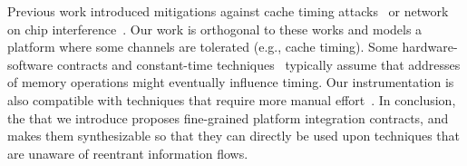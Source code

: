 Previous work introduced mitigations against cache timing attacks~\cite{kar2023mitigating,saileshwar2021mirage,giner2023scatter,werner2019scattercache,qureshi2018ceaser} or network on chip interference~\cite{wassel2013surfnoc,wang2012efficient,schoeberl2012statically,psarras2015phasenoc,alonso2019low,sadeghi2019toward}.
Our work is orthogonal to these works and models a platform where some channels are tolerated (e.g., cache timing).
Some hardware-software contracts and constant-time techniques~\cite{guarnieri2021hardware,wang2023specification,tan2025contractshadowlogic} typically assume that addresses of memory operations might eventually influence timing.
Our instrumentation is also compatible with techniques that require more manual effort~\cite{fastpath}.
In conclusion, the \PICI that we introduce proposes fine-grained platform integration contracts, and makes them synthesizable so that they can directly be used upon techniques that are unaware of reentrant information flows.
